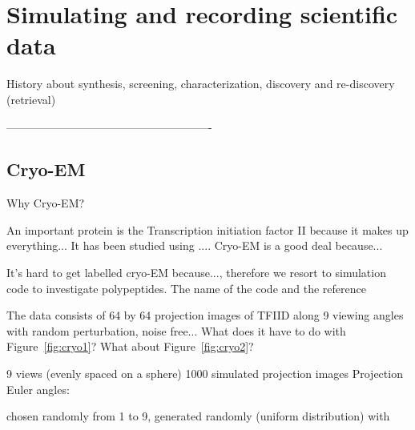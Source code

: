 \section{Simulating and recording scientific data}\label{sec:mat}
History about synthesis, screening, characterization, discovery and re-discovery (retrieval)



-------------------------------------------------------
\subsection{Cryo-EM}\label{subsec:cryo}
Why Cryo-EM?

An important protein is the Transcription initiation factor II because it makes up everything... It has been studied using .... Cryo-EM is a good deal because...

It's hard to get labelled cryo-EM because..., therefore we resort to simulation code to investigate polypeptides. The name of the code and the reference

The data consists of 64 by 64 projection images of TFIID along 9 viewing angles with random perturbation, noise free... What does it have to do with Figure~\ref{fig:cryo1}? What about Figure~\ref{fig:cryo2}?

9 views (evenly spaced on a sphere)
1000 simulated projection images
Projection Euler angles:

chosen randomly from 1 to 9,  generated randomly (uniform distribution) with


